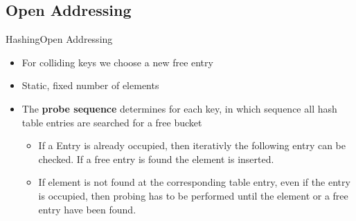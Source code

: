 
\subsection{Open Addressing}

\begin{frame}{Hashing}{Open Addressing}
  \begin{itemize}
    \item<2->
      For colliding keys we choose a new free entry
    \item<3->
      Static, fixed number of elements
    \item<4->
      The \textbf{probe sequence} determines for each key, in which sequence
      all hash table entries are searched for a free bucket
      \begin{itemize}
      \item<5->
        If a Entry is already occupied, then iterativly the {\color{Mittel-Blau}following entry} can
        be checked. If a free entry is found the element is inserted.
      \item<6->
        If element is not found at the corresponding table entry, even if
        the entry is occupied, then probing has to be performed until
        the element or a free entry have been found.
    \end{itemize}
  \end{itemize}  
\end{frame}


